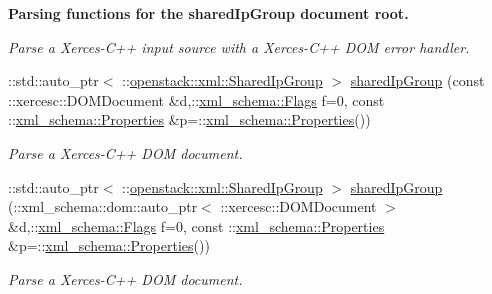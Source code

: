 \begin{Indent}{\bf Parsing functions for the sharedIpGroup document root.}
\begin{DoxyCompactItemize}
\begin{DoxyCompactList}\small\item\em Parse a Xerces-\/C++ input source with a Xerces-\/C++ DOM error handler. \item\end{DoxyCompactList}\item 
::std::auto\_\-ptr$<$ ::\hyperlink{classopenstack_1_1xml_1_1SharedIpGroup}{openstack::xml::SharedIpGroup} $>$ \hyperlink{namespaceopenstack_1_1xml_a01ccc4b68ea74d5ae9618de4c87c1d61}{sharedIpGroup} (const ::xercesc::DOMDocument \&d,::\hyperlink{namespacexml__schema_affb4c227cbd9aa7453dd1dc5a1401943}{xml\_\-schema::Flags} f=0, const ::\hyperlink{namespacexml__schema_ad27ce19a7ee1d3b1064092648898f64c}{xml\_\-schema::Properties} \&p=::\hyperlink{namespacexml__schema_ad27ce19a7ee1d3b1064092648898f64c}{xml\_\-schema::Properties}())
\begin{DoxyCompactList}\small\item\em Parse a Xerces-\/C++ DOM document. \item\end{DoxyCompactList}\item 
::std::auto\_\-ptr$<$ ::\hyperlink{classopenstack_1_1xml_1_1SharedIpGroup}{openstack::xml::SharedIpGroup} $>$ \hyperlink{namespaceopenstack_1_1xml_a7b4f7e645f2eab18bbcea749929a8229}{sharedIpGroup} (::xml\_\-schema::dom::auto\_\-ptr$<$ ::xercesc::DOMDocument $>$ \&d,::\hyperlink{namespacexml__schema_affb4c227cbd9aa7453dd1dc5a1401943}{xml\_\-schema::Flags} f=0, const ::\hyperlink{namespacexml__schema_ad27ce19a7ee1d3b1064092648898f64c}{xml\_\-schema::Properties} \&p=::\hyperlink{namespacexml__schema_ad27ce19a7ee1d3b1064092648898f64c}{xml\_\-schema::Properties}())
\begin{DoxyCompactList}\small\item\em Parse a Xerces-\/C++ DOM document. \item\end{DoxyCompactList}\end{DoxyCompactItemize}
\end{Indent}
